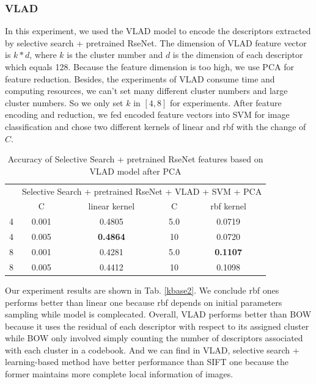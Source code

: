 \documentclass[conference]{IEEEtran}
\begin{document}
\subsubsection{VLAD}
In this experiment, we used the VLAD model to encode the descriptors extracted by selective search + pretrained RseNet. The dimension of VLAD feature vector is $k*d$, where $k$ is the cluster number and $d$ is the dimension of each descriptor which equals 128. Because the feature dimension is too high, we use PCA for feature reduction. Besides, the experiments of VLAD consume time and computing resources, we can't set many different cluster numbers and large cluster numbers. So we only set $k$ in $[4,8]$ for experiments. After feature encoding and reduction, we fed encoded feature vectors into SVM for image classification and chose two different kernels of linear and rbf with the change of $C$.

\begin{table}[htbp]
	\centering
	\newcommand{\tabincell}[2]{\begin{tabular}{@{}#1@{}}#2\end{tabular}}
	\renewcommand\arraystretch{1.0}
	\caption{Accuracy of Selective Search + pretrained RseNet features based on VLAD model after PCA}
	\label{base3}%
	\begin{tabular}{@{}p{1cm}<{\centering}|c|c|c|c}
		\hline
		\multirow{2}{*}{\diagbox[height=2\line,width=1.42cm,font=\tiny]{$k$}{Acc.}{$\mathit{M}$}} &
		\multicolumn{4}{c}{Selective Search + pretrained RseNet + VLAD + SVM + PCA}\\
		\cline{2-5}
		& {C} & {linear kernel} & {C} & {rbf kernel}\\
		\hline
		4   & 0.001  & 0.4805 & 5.0 & 0.0719\\
        4   & 0.005  & \textbf{0.4864} & 10 & 0.0720\\
        \hline
		8   & 0.001 & 0.4281 & 5.0 & \textbf{0.1107}\\
        8   & 0.005  & 0.4412 & 10 & 0.1098\\
        \hline
	\end{tabular}
\end{table}

Our experiment results are shown in Tab. \ref{kbase2}. We conclude rbf ones performs better than linear one because rbf depends on initial parameters sampling while model is complecated. Overall, VLAD performs better than BOW because it uses the residual of each descriptor with respect to its assigned cluster while BOW only involved simply counting the number of descriptors associated with each cluster in a codebook. And we can find in VLAD, selective search + learning-based method have better performance than SIFT one because the former maintains more complete local information of images.
\end{document}
